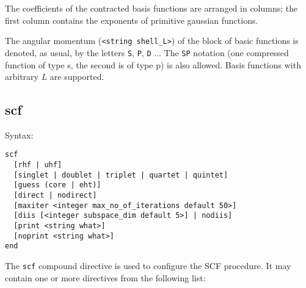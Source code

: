 \documentclass[a4paper, 12pt]{article}
\begin{document}
The coefficients of the contracted basis functions are arranged in columns; the first column contains the exponents of primitive gaussian functions.

The angular momentum (\texttt{<string shell\_L>}) of the block of basic functions is denoted, as usual, by the letters \texttt{S}, \texttt{P}, \texttt{D} ... The \texttt{SP} notation (one compressed function of type s, the second is of type p) is also allowed. Basis functions with arbitrary $L$ are supported.

\subsection{scf}

Syntax:

\begin{lstlisting}
scf
  [rhf | uhf]
  [singlet | doublet | triplet | quartet | quintet]
  [guess (core | eht)]
  [direct | nodirect]
  [maxiter <integer max_no_of_iterations default 50>]
  [diis [<integer subspace_dim default 5>] | nodiis]
  [print <string what>]
  [noprint <string what>]
end
\end{lstlisting}

The \texttt{scf} compound directive is used to configure the SCF procedure. It may contain one or more directives from the following list:
\end{document}
